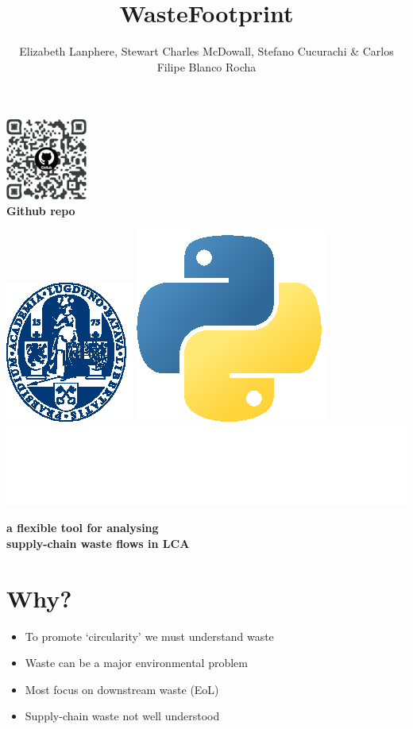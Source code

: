 \documentclass[a0paper,fleqn]{betterposter}
\begin{document}
{{%
\begin{center}
\includegraphics[width=0.2\textwidth]{img/qr_code}\\
{\selectfont\textbf{Github repo}}
\end{center}
\vspace{30pt}
\includegraphics[height=0.1\textwidth]{img/logoUL_white}\hfill
\includegraphics[height=0.07\textwidth]{img/python}\hfill
\includegraphics[height=0.07\textwidth]{img/brightway}\hfill
}

}{

\title{WasteFootprint}
{\selectfont\textbf{a flexible tool for analysing\\ supply-chain waste flows in LCA}}\\

\vspace{10pt}
\author{Elizabeth Lanphere, Stewart Charles McDowall, Stefano Cucurachi \& Carlos Filipe Blanco Rocha}
\vspace{30pt}

\section{Why?}
\begin{itemize}
    \item To promote `circularity' we must understand waste  
    \item Waste can be a major environmental problem
    \item Most focus on downstream waste (EoL)
    \item Supply-chain waste not well understood
\end{itemize}\\

}
\end{document}
